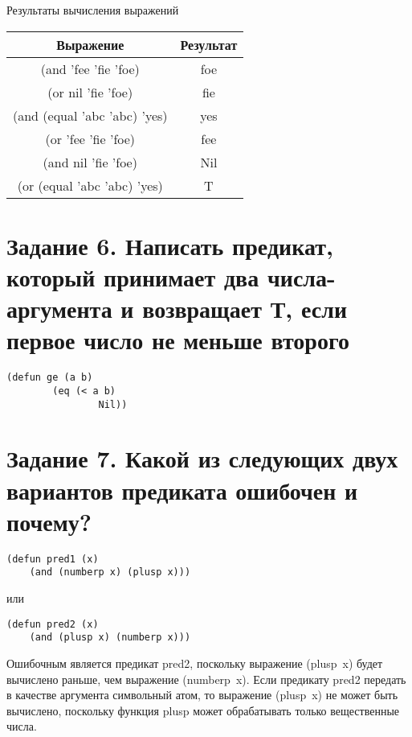 \begin{center}
	\begin{threeparttable}
		\captionsetup{justification=raggedright,singlelinecheck=off}
		\caption{\label{5}Результаты вычисления выражений}
		\centering
		\begin{tabular}{|c|c|}
			\hline
			Выражение & Результат\\
			\hline
			(and 'fee 'fie 'foe) & foe\\
			\hline
			(or nil 'fie 'foe) & fie\\
			\hline
			(and (equal 'abc 'abc) 'yes) & yes\\
			\hline
			(or 'fee 'fie 'foe) & fee\\
			\hline
			(and nil 'fie 'foe) & Nil\\
			\hline
			(or (equal 'abc 'abc) 'yes) & T\\
			\hline
		\end{tabular}
	\end{threeparttable}
\end{center}

\section{Задание 6. Написать предикат, который принимает два числа-аргумента и возвращает Т, если первое число не меньше второго}

\begin{lstlisting}
(defun ge (a b)
		(eq (< a b)
				Nil))
\end{lstlisting}

\section{Задание 7. Какой из следующих двух вариантов предиката ошибочен и почему?}

\begin{lstlisting}
(defun pred1 (x) 
	(and (numberp x) (plusp x)))
\end{lstlisting}
или
\begin{lstlisting}
(defun pred2 (x)
	(and (plusp x) (numberp x)))
\end{lstlisting}

Ошибочным является предикат pred2, поскольку выражение (plusp~x) будет вычислено раньше, чем выражение (numberp~x). Если предикату pred2 передать в качестве аргумента символьный атом, то выражение (plusp~x) не может быть вычислено, поскольку функция plusp может обрабатывать только вещественные числа.

